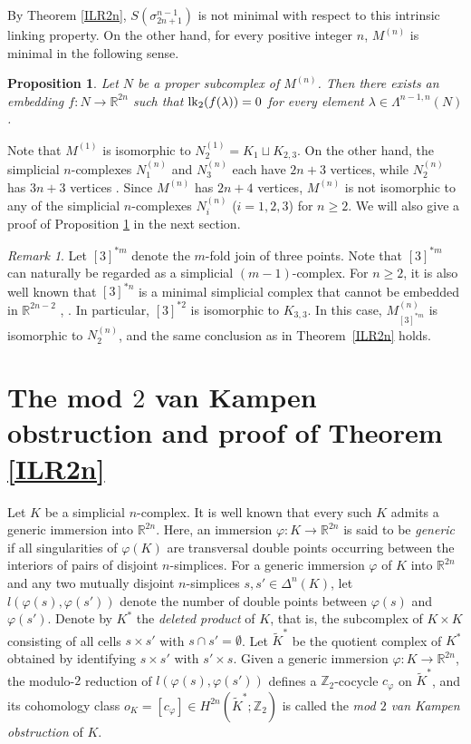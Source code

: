 \documentclass{amsart}
\newtheorem{Proposition}[Theorem]{Proposition}
\theoremstyle{definition}
\theoremstyle{remark}
\newtheorem{Remark}[Theorem]{Remark}
\numberwithin{equation}{section}
\begin{document}
By Theorem \ref{ILR2n}, $S(\sigma_{2n+1}^{n-1})$ is not minimal with respect to this intrinsic linking property. On the other hand, for every positive integer $n$, $M^{(n)}$ is minimal in the following sense.

\begin{Proposition}\label{ILRn2min}
Let $N$ be a proper subcomplex of $M^{(n)}$. Then there exists an embedding $f \colon N \to \mathbb{R}^{2n}$ such that ${\rm lk}_2(f(\lambda)) = 0$ for every element $\lambda \in \Lambda^{n-1,n}(N)$.
\end{Proposition}

Note that $M^{(1)}$ is isomorphic to $N_{2}^{(1)} = K_1 \sqcup K_{2,3}$. On the other hand, the simplicial $n$-complexes $N_{1}^{(n)}$ and $N_3^{(n)}$ each have $2n+3$ vertices, while $N_2^{(n)}$ has $3n+3$ vertices \cite{N26b}. Since $M^{(n)}$ has $2n+4$ vertices, $M^{(n)}$ is not isomorphic to any of the simplicial $n$-complexes $N_{i}^{(n)}$ ($i=1,2,3$) for $n \ge 2$. We will also give a proof of Proposition \ref{ILRn2min} in the next section.


\begin{Remark}\label{k33}
Let $[3]^{*m}$ denote the $m$-fold join of three points. Note that $[3]^{*m}$ can naturally be regarded as a simplicial $(m-1)$-complex. For $n \ge 2$, it is also well known that $[3]^{*n}$ is a minimal simplicial complex that cannot be embedded in $\mathbb{R}^{2n-2}$ \cite{VK33}, \cite{Flores32}. In particular, $[3]^{*2}$ is isomorphic to $K_{3,3}$. In this case, $M_{[3]^{*m}}^{(n)}$ is isomorphic to $N_2^{(n)}$, and the same conclusion as in Theorem~\ref{ILR2n} holds. 
\end{Remark}




\section{The mod $2$ van Kampen obstruction and proof of Theorem \ref{ILR2n}}

Let $K$ be a simplicial $n$-complex. It is well known that every such $K$ admits a generic immersion into $\mathbb{R}^{2n}$. Here, an immersion $\varphi \colon K \to \mathbb{R}^{2n}$ is said to be \textit{generic} if all singularities of $\varphi(K)$ are transversal double points occurring between the interiors of pairs of disjoint $n$-simplices. For a generic immersion $\varphi$ of $K$ into $\mathbb{R}^{2n}$ and any two mutually disjoint $n$-simplices $s, s' \in \varDelta^n(K)$, let $l(\varphi(s),\varphi(s'))$ denote the number of double points between $\varphi(s)$ and $\varphi(s')$. Denote by $K^*$ the \emph{deleted product} of $K$, that is, the subcomplex of $K \times K$ consisting of all cells $s \times s'$ with $s \cap s' = \emptyset$. Let $\widetilde{K}^*$ be the quotient complex of $K^*$ obtained by identifying $s \times s'$ with $s' \times s$. Given a generic immersion $\varphi \colon K \to \mathbb{R}^{2n}$, the modulo-$2$ reduction of $l(\varphi(s),\varphi(s'))$ defines a $\mathbb{Z}_2$-cocycle $c_{\varphi}$ on $\widetilde{K}^*$, and its cohomology class $o_K = [c_{\varphi}] \in H^{2n}(\widetilde{K}^*;\mathbb{Z}_2)$ is called the \emph{mod $2$ van Kampen obstruction} of $K$.
\end{document}
